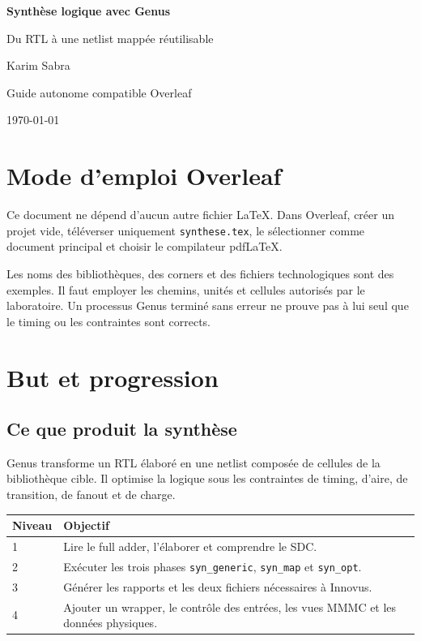 \documentclass[11pt,a4paper,openany]{report}
\begin{document}
\begin{titlepage}
  \centering
  \vspace*{28mm}
  {\Huge\bfseries\color{GuideBlue}Synthèse logique avec Genus\par}
  \vspace{7mm}
  {\LARGE Du RTL à une netlist mappée réutilisable\par}
  \vfill
  {\Large Karim Sabra\par}
  \vspace{4mm}
  {Guide autonome compatible Overleaf\par}
  {\today\par}
\end{titlepage}

\chapter*{Mode d'emploi Overleaf}

Ce document ne dépend d'aucun autre fichier LaTeX. Dans Overleaf, créer un
projet vide, téléverser uniquement \texttt{synthese.tex}, le sélectionner
comme document principal et choisir le compilateur pdfLaTeX.

\begin{warningbox}[Portée]
Les noms des bibliothèques, des corners et des fichiers technologiques sont
des exemples. Il faut employer les chemins, unités et cellules autorisés par
le laboratoire. Un processus Genus terminé sans erreur ne prouve pas à lui
seul que le timing ou les contraintes sont corrects.
\end{warningbox}

\tableofcontents

\chapter{But et progression}

\section{Ce que produit la synthèse}

Genus transforme un RTL élaboré en une netlist composée de cellules de la
bibliothèque cible. Il optimise la logique sous les contraintes de timing,
d'aire, de transition, de fanout et de charge.

\begin{longtable}{p{}p{}}
\toprule
Niveau & Objectif \\
\midrule
1 & Lire le full adder, l'élaborer et comprendre le SDC. \\
2 & Exécuter les trois phases \texttt{syn\_generic}, \texttt{syn\_map} et
\texttt{syn\_opt}. \\
3 & Générer les rapports et les deux fichiers nécessaires à Innovus. \\
4 & Ajouter un wrapper, le contrôle des entrées, les vues MMMC et les données
physiques. \\
\bottomrule
\end{longtable}
\end{document}
